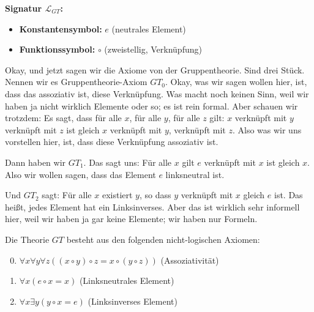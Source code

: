 \begin{math-stroke}
\textbf{Signatur \texorpdfstring{$\mathcal{L}_{GT}$}{LGT}:}
\begin{itemize}
    \item \textbf{Konstantensymbol:} $e$ (neutrales Element)
    \item \textbf{Funktionssymbol:} $\circ$ (zweistellig, Verknüpfung)
\end{itemize}
\end{math-stroke}

\begin{spoken-clean}[01:22:46 - 01:24:57]
Okay, und jetzt sagen wir die Axiome von der Gruppentheorie. Sind drei Stück. Nennen wir es Gruppentheorie-Axiom $GT_0$. Okay, was wir sagen wollen hier, ist, dass das assoziativ ist, diese Verknüpfung. Was macht noch keinen Sinn, weil wir haben ja nicht wirklich Elemente oder so; es ist rein formal. Aber schauen wir trotzdem: Es sagt, dass für alle $x$, für alle $y$, für alle $z$ gilt: $x$ verknüpft mit $y$ verknüpft mit $z$ ist gleich $x$ verknüpft mit $y$, verknüpft mit $z$. Also was wir uns vorstellen hier, ist, dass diese Verknüpfung assoziativ ist.

Dann haben wir $GT_1$. Das sagt uns: Für alle $x$ gilt $e$ verknüpft mit $x$ ist gleich $x$. Also wir wollen sagen, dass das Element $e$ linksneutral ist.

Und $GT_2$ sagt: Für alle $x$ existiert $y$, so dass $y$ verknüpft mit $x$ gleich $e$ ist. Das heißt, jedes Element hat ein Linksinverses. Aber das ist wirklich sehr informell hier, weil wir haben ja gar keine Elemente; wir haben nur Formeln.
\end{spoken-clean}

\begin{math-stroke}
Die Theorie $GT$ besteht aus den folgenden nicht-logischen Axiomen:
\begin{enumerate}[label=\textbf{(GT$_{\mathbf{\arabic*}}$)}]
    \setcounter{enumi}{-1} \item $\forall x \forall y \forall z ((x \circ y) \circ z = x \circ (y \circ z))$ \hfill (Assoziativität)
    \item $\forall x (e \circ x = x)$ \hfill (Linksneutrales Element)
    \item $\forall x \exists y (y \circ x = e)$ \hfill (Linksinverses Element)
\end{enumerate}
\end{math-stroke}

